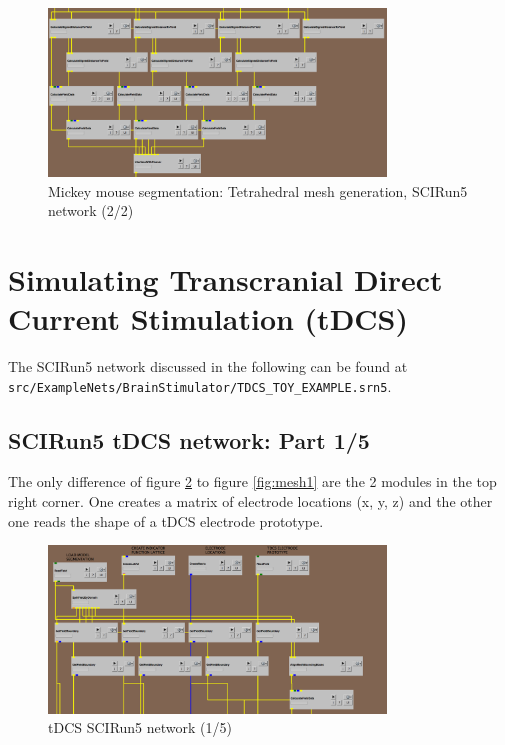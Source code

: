 \documentclass[fleqn,11pt,openany]{book}
\begin{document}
\begin{figure}[!h]
\centering
\includegraphics[width=0.8\textwidth]{BrainStimulation_figures/make_mesh2.png}
\caption{ Mickey mouse segmentation: Tetrahedral mesh generation, SCIRun5 network (2/2)}
\label{fig:mesh2}
\end{figure}


\section{Simulating Transcranial Direct Current Stimulation (tDCS)}\label{sec:sim_tdcs}
The SCIRun5 network discussed in the following can be found at \texttt{src/ExampleNets/BrainStimulator/TDCS\_TOY\_EXAMPLE.srn5}.

\subsection{SCIRun5 tDCS network: Part 1/5}
The only difference of figure \ref{fig:tdcs1} to figure \ref{fig:mesh1} are the 2 modules in the top right corner. One creates a matrix of electrode locations (x, y, z) and
the other one reads the shape of a tDCS electrode prototype.

\begin{figure}[!h]
\centering
\includegraphics[width=0.8\textwidth]{BrainStimulation_figures/tdcs_1.png}
\caption{ tDCS SCIRun5 network (1/5)}
\label{fig:tdcs1}
\end{figure}
\end{document}
